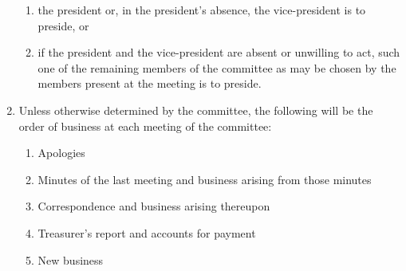 \begin{enumerate}
\begin{enumerate}
    \item the president or, in the president’s absence, the vice-president is to preside, or
    \item if the president and the vice-president are absent or unwilling to act, such one of the remaining members of the committee as may be chosen by the members present at the meeting is to preside.
  \end{enumerate}
\item Unless otherwise determined by the committee, the following will be the order of business at each meeting of the committee:
  \begin{enumerate}
    \item Apologies
    \item Minutes of the last meeting and business arising from those minutes
    \item Correspondence and business arising thereupon
    \item Treasurer’s report and accounts for payment
    \item New business
  \end{enumerate}
\end{enumerate}
